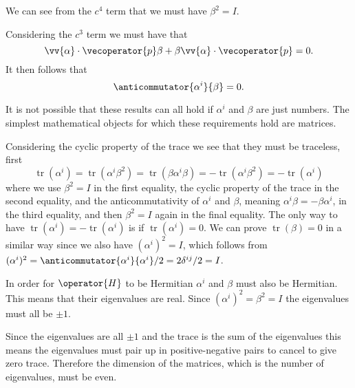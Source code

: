 \documentclass[fleqn]{NotesClass}
\newcommand{\ident}{I}
\newcommand*{\hamiltonian}{H}
\DeclareMathOperator{\tr}{tr}
\begin{document}
    We can see from the \(c^4\) term that we must have \(\beta^2 = \ident\).
    
    Considering the \(c^3\) term we must have that 
    \begin{equation}
        \vv{\alpha}\cdot\vecoperator{p}\beta + \beta\vv{\alpha} \cdot \vecoperator{p} = 0.
    \end{equation}
    It then follows that
    \begin{equation}
        \anticommutator{\alpha^i}{\beta} = 0.
    \end{equation}
    
    It is not possible that these results can all hold if \(\alpha^i\) and \(\beta\) are just numbers.
    The simplest mathematical objects for which these requirements hold are matrices.
    
    Considering the cyclic property of the trace we see that they must be traceless, first
    \begin{equation}
        \tr(\alpha^i) = \tr(\alpha^i\beta^2) = \tr(\beta \alpha^i \beta) = -\tr(\alpha^i\beta^2) = -\tr(\alpha^i)
    \end{equation}
    where we use \(\beta^2 = \ident\) in the first equality, the cyclic property of the trace in the second equality, and the anticommutativity of \(\alpha^i\) and \(\beta\), meaning \(\alpha^i\beta = -\beta\alpha^i\), in the third equality, and then \(\beta^2 = \ident\) again in the final equality.
    The only way to have \(\tr(\alpha^i) = -\tr(\alpha^i)\) is if \(\tr(\alpha^i) = 0\).
    We can prove \(\tr(\beta) = 0\) in a similar way since we also have \((\alpha^i)^2 = \ident\), which follows from \((\alpha^i)^2 = \anticommutator{\alpha^i}{\alpha^i}/2 = 2\delta^{ij}/2 = \ident\).
    
    In order for \(\operator{\hamiltonian}\) to be Hermitian \(\alpha^i\) and \(\beta\) must also be Hermitian.
    This means that their eigenvalues are real.
    Since \((\alpha^i)^2 = \beta^2 = \ident\) the eigenvalues must all be \(\pm 1\).
    
    Since the eigenvalues are all \(\pm 1\) and the trace is the sum of the eigenvalues this means the eigenvalues must pair up in positive-negative pairs to cancel to give zero trace.
    Therefore the dimension of the matrices, which is the number of eigenvalues, must be even.
    
\end{document}
